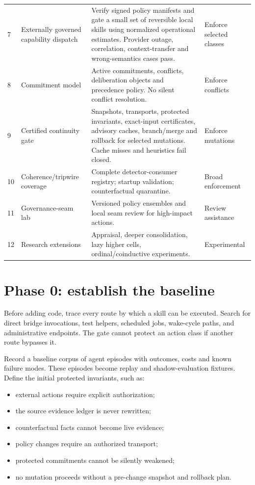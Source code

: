 \documentclass[11pt,oneside]{report}
\begin{document}
\begin{longtable}{@{}C{0.40in}L{1.40in}L{3.05in}L{1.55in}@{}}
7 & Externally governed capability dispatch & Verify signed policy manifests and gate a small set of reversible local skills using normalized operational estimates. Provider outage, correlation, context-transfer and wrong-semantics cases pass. & Enforce selected classes \\
8 & Commitment model & Active commitments, conflicts, deliberation objects and precedence policy. No silent conflict resolution. & Enforce conflicts \\
9 & Certified continuity gate & Snapshots, transports, protected invariants, exact-input certificates, advisory caches, branch/merge and rollback for selected mutations. Cache misses and heuristics fail closed. & Enforce mutations \\
10 & Coherence/tripwire coverage & Complete detector-consumer registry; startup validation; counterfactual quarantine. & Broad enforcement \\
11 & Governance-seam lab & Versioned policy ensembles and local seam review for high-impact actions. & Review assistance \\
12 & Research extensions & Appraisal, deeper consolidation, lazy higher cells, ordinal/coinductive experiments. & Experimental \\
\bottomrule
\end{longtable}

\section{Phase 0: establish the baseline}

Before adding code, trace every route by which a skill can be executed. Search for direct bridge invocations, test helpers, scheduled jobs, wake-cycle paths, and administrative endpoints. The gate cannot protect an action class if another route bypasses it.

Record a baseline corpus of agent episodes with outcomes, costs and known failure modes. These episodes become replay and shadow-evaluation fixtures. Define the initial protected invariants, such as:

\begin{itemize}
  \item external actions require explicit authorization;
  \item the source evidence ledger is never rewritten;
  \item counterfactual facts cannot become live evidence;
  \item policy changes require an authorized transport;
  \item protected commitments cannot be silently weakened;
  \item no mutation proceeds without a pre-change snapshot and rollback plan.
\end{itemize}
\end{document}
